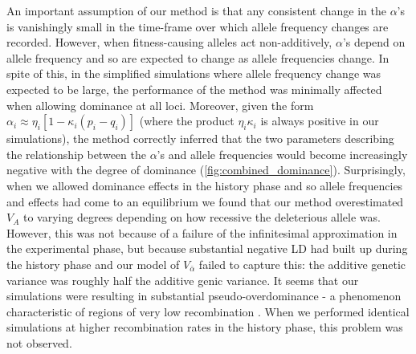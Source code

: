 \documentclass[12pt]{article}
\begin{document}
\begin{bibunit}
An important assumption of our method is that any consistent change in the $\alpha$'s is vanishingly small in the time-frame over which allele frequency changes are recorded. However, when fitness-causing alleles act non-additively, $\alpha$'s depend on allele frequency and so are expected to change as allele frequencies change. In spite of this, in the simplified simulations where allele frequency change was expected to be large, the performance of the method was minimally affected when allowing dominance at all loci. Moreover, given the form $\alpha_i \approx \eta_i[1 - \kappa_i(p_i-q_i)]$ (where the product $\eta_i\kappa_i$ is always positive in our simulations), the method correctly inferred that the two parameters describing the relationship between the $\alpha$'s and allele frequencies would become increasingly negative with the degree of dominance (\ref{fig:combined_dominance}). Surprisingly, when we allowed dominance effects in the history phase and so allele frequencies and effects had come to an equilibrium we found that our method overestimated $V_A$ to varying degrees depending on how recessive the deleterious allele was. However, this was not because of a failure of the infinitesimal approximation in the experimental phase, but because substantial negative LD had built up during the history phase and our model of $V_{\bar \alpha}$ failed to capture this: the additive genetic variance was roughly half the additive genic variance.  It seems that our simulations were resulting in substantial pseudo-overdominance \citep{abu2023conditions} - a phenomenon characteristic of regions of very low recombination \citep{salson2025interplay}. When we performed identical simulations at higher recombination rates in the history phase, this problem was not observed.


\end{bibunit}
\end{document}
